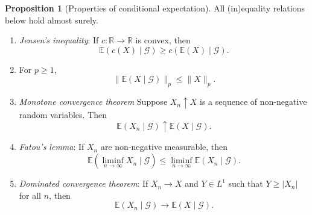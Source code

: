 \documentclass[parskip=full]{article}
\theoremstyle{definition}
\newtheorem*{proposition}{Proposition}
\newcommand{\R}{\mathbb{R}}
\newcommand{\1}{\mathbbm{1}}
\newcommand{\E}{\mathbb{E}}
\begin{document}
\begin{proposition}[Properties of conditional expectation]
    All (in)equality relations below hold almost surely.
    \begin{enumerate}
      \item \emph{Jensen's inequality}: If $c: \R \to \R$ is convex, then
        \[
          \E(c(X) \mid \mathcal{G}) \geq c(\E(X) \mid \mathcal{G}).
        \]
        \item For $p \geq 1$,
        \[
          \|\E(X \mid \mathcal{G})\|_p \leq \|X\|_p.
        \]
      \item \emph{Monotone convergence theorem} Suppose $X_n \uparrow X$ is a sequence of non-negative random variables. Then
        \[
          \E(X_n\mid \mathcal{G}) \uparrow \E(X \mid \mathcal{G}).
        \]
      \item \emph{Fatou's lemma}: If $X_n$ are non-negative measurable, then
        \[
          \E\left(\liminf_{n \to \infty} X_n \mid \mathcal{G}\right) \leq \liminf_{n \to \infty} \E(X_n \mid \mathcal{G}).
        \]
      \item \emph{Dominated convergence theorem}: If $X_n \to X$ and $Y \in L^1$ such that $Y \geq |X_n|$ for all $n$, then
        \[
          \E(X_n \mid \mathcal{G}) \to \E(X \mid \mathcal{G}).
        \]
    \end{enumerate}
  \end{proposition}
\end{document}

